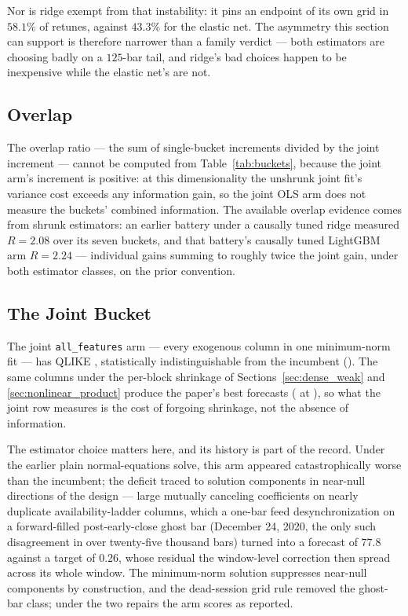 Nor is ridge exempt from that instability: it pins an endpoint of its
own grid in $58.1\%$ of retunes, against $43.3\%$ for the elastic net.
The asymmetry this section can support is therefore narrower than a
family verdict --- both estimators are choosing badly on a $125$-bar
tail, and ridge's bad choices happen to be inexpensive while the
elastic net's are not.

\subsection{Overlap}

The overlap ratio --- the sum of single-bucket increments divided by the
joint increment --- cannot be computed from Table~\ref{tab:buckets},
because the joint arm's increment is positive: at this dimensionality the
unshrunk joint fit's variance cost exceeds any information gain, so the
joint OLS arm does not measure the buckets' combined information. The
available overlap evidence comes from shrunk estimators: an earlier
battery under a causally tuned ridge measured $R = 2.08$ over its seven
buckets, and that battery's causally tuned LightGBM arm $R = 2.24$ ---
individual gains summing to roughly twice the joint gain, under both
estimator classes, on the prior convention. 

\subsection{The Joint Bucket}

The joint \texttt{all\_features} arm --- every exogenous column in one
minimum-norm fit --- has QLIKE \unifAllFeaturesQLIKE{}, statistically
indistinguishable from the incumbent (\unifAllFeaturesDM{}). The same
columns under the per-block shrinkage of Sections~\ref{sec:dense_weak}
and \ref{sec:nonlinear_product} produce the paper's best forecasts
(\unifBlkThreeUserQLIKE{} at \unifBlkThreeUserDM{}), so what the joint
row measures is the cost of forgoing shrinkage, not the absence of
information.

The estimator choice matters here, and its history is part of the
record. Under the earlier plain normal-equations solve, this arm appeared
catastrophically worse than the incumbent; the deficit traced to
solution components in near-null directions of the design --- large
mutually canceling coefficients on nearly duplicate availability-ladder
columns, which a one-bar feed desynchronization on a forward-filled
post-early-close ghost bar (December 24, 2020, the only such
disagreement in over twenty-five thousand bars) turned into a forecast
of $77.8$ against a target of $0.26$, whose residual the window-level
correction then spread across its whole window. The minimum-norm
solution suppresses near-null components by construction, and the
dead-session grid rule removed the ghost-bar class; under the two
repairs the arm scores as reported.


